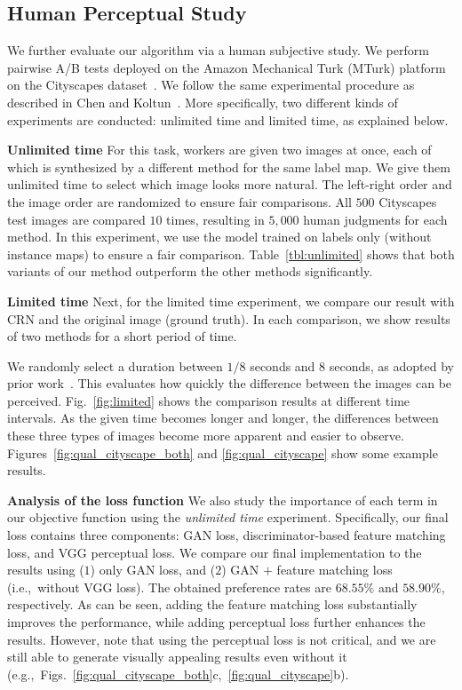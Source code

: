 \subsection{Human Perceptual Study} \label{sec:results:qual}
We further evaluate our algorithm via a human subjective study. We perform pairwise A/B tests deployed on the Amazon Mechanical Turk (MTurk) platform on the Cityscapes dataset~\cite{Cordts2016cityscapes}. We follow the same experimental procedure as described in Chen and Koltun~\cite{chen2017photographic}. More specifically, two different kinds of experiments are conducted: unlimited time and limited time, as explained below.

{ \bf Unlimited time} For this task, workers are given two images at once, each of which is synthesized by a different method for the same label map. We give them unlimited time to select which image looks more natural. The left-right order and the image order are randomized to ensure fair comparisons. All $500$ Cityscapes test images are compared $10$ times, resulting in $5,000$ human judgments for each method. In this experiment, we use the model trained on labels only (without instance maps) to ensure a fair comparison.
Table~\ref{tbl:unlimited} shows that both variants of our method outperform the other methods significantly.

{ \bf Limited time} Next, for the limited time experiment, we compare our result with CRN and the original image (ground truth). In each comparison, we show results of two methods for a short period of time. 

We randomly select a duration between $1/8$ seconds and $8$ seconds, as adopted by prior work~\cite{chen2017photographic}. This evaluates how quickly the difference between the images can be perceived. 
Fig.~\ref{fig:limited} shows the comparison results at different time intervals. As the given time becomes longer and longer, the differences between these three types of images become more apparent and easier to observe.
Figures~\ref{fig:qual_cityscape_both} and \ref{fig:qual_cityscape} show some example results. 

{ \bf Analysis of the loss function} We also study the importance of each term in our objective function using the \textit{unlimited time}  experiment. Specifically, our final loss contains three components: GAN loss, discriminator-based feature matching loss, and VGG perceptual loss. We compare our final implementation to the results using ($1$) only GAN loss, and ($2$) GAN $+$ feature matching loss (i.e.,\ without VGG loss). The obtained preference rates are $68.55\%$ and $58.90\%$, respectively. As can be seen, adding the feature matching loss substantially improves the performance, while adding perceptual loss further enhances the results. However, note that using the perceptual loss is not critical, and we are still able to generate visually appealing results even without it (e.g.,\ Figs.~\ref{fig:qual_cityscape_both}c,~\ref{fig:qual_cityscape}b). 


